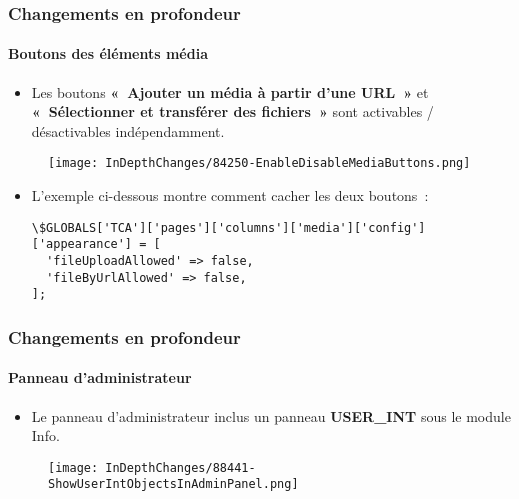 
\begin{frame}[fragile]
	\frametitle{Changements en profondeur}
	\framesubtitle{Boutons des éléments média}

	\lstset{basicstyle=\tiny\ttfamily}

	\begin{itemize}
		\item Les boutons \textbf{«~Ajouter un média à partir d’une URL~»} et
			\textbf{«~Sélectionner et transférer des fichiers~»} sont activables
			/ désactivables indépendamment.
	\end{itemize}

	\begin{figure}
		\texttt{[image: InDepthChanges/84250-EnableDisableMediaButtons.png]}
	\end{figure}

	\begin{itemize}
		\item L'exemple ci-dessous montre comment cacher les deux boutons~:
\begin{lstlisting}
\$GLOBALS['TCA']['pages']['columns']['media']['config']['appearance'] = [
  'fileUploadAllowed' => false,
  'fileByUrlAllowed' => false,
];
\end{lstlisting}

	\end{itemize}

\end{frame}


\begin{frame}[fragile]
	\frametitle{Changements en profondeur}
	\framesubtitle{Panneau d'administrateur}

	\begin{itemize}
		\item Le panneau d'administrateur inclus un panneau \textbf{USER\_INT} sous le module Info.
	\end{itemize}

	\begin{figure}
		\texttt{[image: InDepthChanges/88441-ShowUserIntObjectsInAdminPanel.png]}
	\end{figure}

\end{frame}

